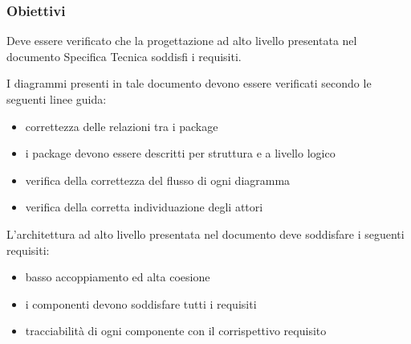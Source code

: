 \documentclass[a4paper,11pt]{article}
\begin{document}
\subsubsection{Obiettivi}
Deve essere verificato che la progettazione ad alto livello presentata nel documento Specifica Tecnica soddisfi i requisiti.

I diagrammi presenti in tale documento devono essere verificati secondo le seguenti linee guida: 
\begin{itemize}

\item correttezza delle relazioni tra i package
\item i package devono essere descritti per struttura e a livello logico

\item verifica della correttezza del flusso di ogni diagramma
\item verifica della corretta individuazione degli attori
\end{itemize}
L'architettura ad alto livello presentata nel documento deve soddisfare i seguenti requisiti:
\begin{itemize}
\item basso accoppiamento ed alta coesione
\item i componenti devono soddisfare tutti i requisiti 
\item tracciabilità di ogni componente con il corrispettivo requisito
\end{itemize}
\end{document}
